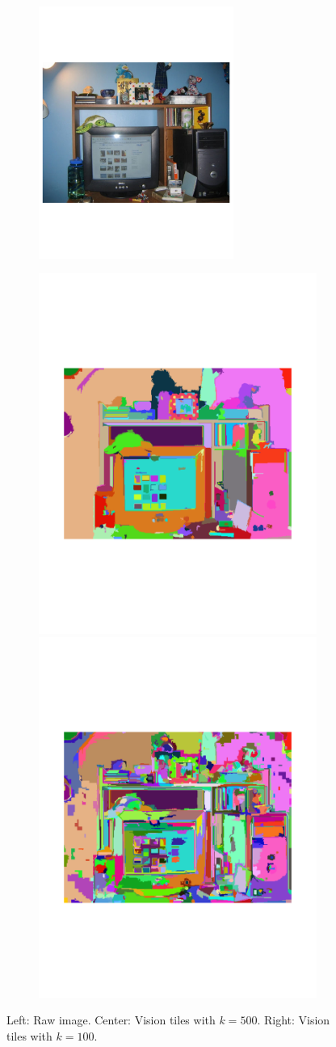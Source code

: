 \begin{figure}
\vspace{-30pt}
\centering
\begin{subfigure}[b]{\textwidth}
\centering
\includegraphics[width=0.7\textwidth]{plots/vision_0.pdf}
\vspace{-70pt}
\end{subfigure}
\begin{subfigure}[b]{\textwidth}
\centering
\includegraphics[width=.4\textwidth]{plots/vision_500.pdf}%
\includegraphics[width=.4\textwidth]{plots/vision_100.pdf}
\vspace{-30pt}
\end{subfigure}
\caption{Left: Raw image. Center: Vision tiles with $k=500$. Right: Vision tiles with $k=100$.}
\label{vision_example}
\end{figure}

